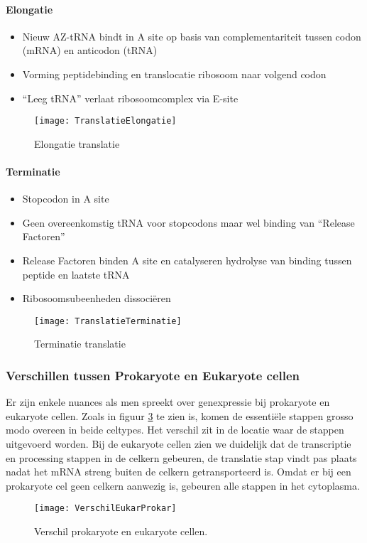 \documentclass[a4paper,kul]{kulakarticle} %
\begin{document}
\paragraph{Elongatie}
\begin{itemize}
	\item Nieuw AZ-tRNA bindt in A site op basis van complementariteit tussen codon (mRNA) en anticodon (tRNA)
	\item Vorming peptidebinding en translocatie ribosoom naar volgend codon
	\item “Leeg tRNA” verlaat ribosoomcomplex via E-site
\end{itemize}
\begin{figure}[h]
	\centering
	\texttt{[image: TranslatieElongatie]}
	\caption[Elongatie translatie]{Elongatie translatie}
	\label{fig:translatieelongatie}
\end{figure}
\paragraph{Terminatie}
\begin{itemize}
	\item Stopcodon in A site
	\item Geen overeenkomstig tRNA voor stopcodons maar wel binding van “Release Factoren”
	\item Release Factoren binden A site en catalyseren hydrolyse van binding tussen peptide en laatste tRNA
	\item Ribosoomsubeenheden dissociëren
\end{itemize}
\begin{figure}[!h]
	\centering
	\texttt{[image: TranslatieTerminatie]}
	\caption[Terminatie translatie]{Terminatie translatie}
	\label{fig:translatieterminatie}
\end{figure}
\subsubsection{Verschillen tussen Prokaryote en Eukaryote cellen}
Er zijn enkele nuances als men spreekt over genexpressie bij prokaryote en eukaryote cellen. Zoals in figuur \ref{fig:verschileukarprokar} te zien is, komen de essentiële stappen grosso modo overeen in beide celtypes. Het verschil zit in de locatie waar de stappen uitgevoerd worden. Bij de eukaryote cellen zien we duidelijk dat de transcriptie en processing stappen in de celkern gebeuren, de translatie stap vindt pas plaats nadat het mRNA streng buiten de celkern getransporteerd is. Omdat er bij een prokaryote cel geen celkern aanwezig is, gebeuren alle stappen in het cytoplasma.
\begin{figure}[h]
	\centering
	\texttt{[image: VerschilEukarProkar]}
	\caption[Verschil prokaryote en eukaryote]{Verschil prokaryote en eukaryote cellen.}
	\label{fig:verschileukarprokar}
\end{figure}
\end{document}
